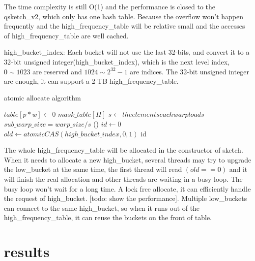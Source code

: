 \documentclass[conference]{IEEEtran}
\begin{document}
The time complexity is still O(1) and the performance is closed to the qsketch\_v2, which only has one hash table. Because the overflow won’t happen frequently and the high\_frequency\_table will be relative small and the accesses of high\_frequency\_table are well cached.

high\_bucket\_index:
Each bucket will not use the last 32-bits, and convert it to a 32-bit unsigned integer(high\_bucket\_index), which is the next level index, $0 \sim 1023$ are reserved and 
$1024 \sim 2 ^ {32} - 1$
are indices. 
The 32-bit unsigned integer are enough, it can support a 2 TB high\_frequency\_table.

\begin{algorithm}
    \DontPrintSemicolon
    \caption{atomic allocate algorithm}
    $table[p * w] \longleftarrow 0$\;
    $mask\_table[H]$\;
    $s \longleftarrow the elements each warp loads$\;
    $sub\_warp\_size = warp\_size / s $\;
\Fn(){}
{
    $id \leftarrow 0$\;
    $old \leftarrow atomicCAS(high\_bucket\_index, 0, 1)$\;
    \KwRet id\;
}
\end{algorithm}


The whole high\_frequency\_table will be allocated in the constructor of sketch. When it needs to allocate a new high\_bucket, several threads may try to upgrade the low\_bucket at the same time, the first thread will read $(old == 0)$ and it will finish the real allocation and other threads are waiting in a busy loop. The busy loop won't wait for a long time.
A lock free allocate, it can efficiently handle the request of high\_bucket. [todo: show the performance].
Multiple low\_buckets can connect to the same high\_bucket, so when it runs out of the high\_frequency\_table, it can reuse the buckets on the front of table.
\section{results}
\end{document}
